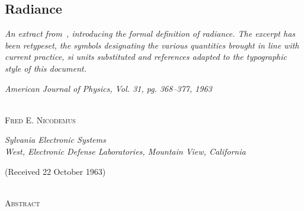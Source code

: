 \begin{refsection}
\chapter{Radiance}
\label{ch:radiance}

\begin{center}
\begin{minipage}{\textwidth - 2em}
\itshape\small
An extract from~\cite{nicodemus63}, introducing the formal definition of
radiance. The excerpt has been retypeset, the symbols designating the various
quantities brought in line with current practice, \gls{si} units substituted and
references adapted to the typographic style of this document.
\end{minipage}
\end{center}

\begin{center}
\textit{\Large American Journal of Physics, Vol. 31, pg. 368--377, 1963}

{\Large \adfflourishleftdouble\quad{}\quad\adfflourishrightdouble}\\

\textsc{Fred E. Nicodemus}
\vspace{3pt}

\textit{\small Sylvania Electronic Systems\\
West, Electronic Defense Laboratories, Mountain View, California}

\vspace{3pt}
(Received 22 October 1963)

{\Large \adfclosedflourishleft\quad\adfclosedflourishright}\\

\textsc{Abstract}


\end{center}
\end{refsection}
